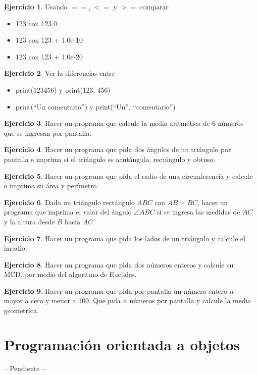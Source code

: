 \documentclass[12pt]{article}
\theoremstyle{definition}
\newtheorem{exercise}{Ejercicio}[section]
\begin{document}
    \begin{exercise}
        Usando $==$, $<=$ y $>=$ comparar
        \begin{itemize}
            \item 123 con 123.0
            \item 123 con 123 + 1.0e-10
            \item 123 con 123 + 1.0e-20
        \end{itemize}
    \end{exercise}

    \begin{exercise}
        Ver la diferencias entre
        \begin{itemize}
            \item print(123456) y print(123, 456)
            \item print(``Un comentario'') y print(``Un'', ``comentario'')
        \end{itemize}
    \end{exercise}

    \begin{exercise}
        Hacer un programa que calcule la media aritmética de 6 números que se ingresan por pantalla.
    \end{exercise}

    \begin{exercise}
        Hacer un programa que pida dos ángulos de un triángulo por pantalla e imprima si el triángulo es acutángulo, rectángulo y obtuso.
    \end{exercise}

    \begin{exercise}
        Hacer un programa que pida el radio de una circunferencia y calcule e imprima su área y perímetro.
    \end{exercise}

    \begin{exercise}
        Dado un triángulo rectángulo $ABC$ con $AB = BC$, hacer un programa que imprima el valor del ángulo $\angle ABC$ si se ingresa las medidas de $AC$ y la altura desde $B$ hacia $AC$.
    \end{exercise}

    \begin{exercise}
        Hacer un programa que pida los lados de un triángulo y calcule el inradio.
    \end{exercise}

    \begin{exercise}
        Hacer un programa que pida dos números enteros y calcule su MCD, por medio del algoritmo de Euclides.
    \end{exercise}

    \begin{exercise}
        Hacer un programa que pida por pantalla un número entero $n$ mayor a cero y menor a 100.
        Que pida $n$ números por pantalla y calcule la media geometríca.
    \end{exercise}


    \newpage
    \section{Programación orientada a objetos}
    -- Pendiente --
\end{document}
